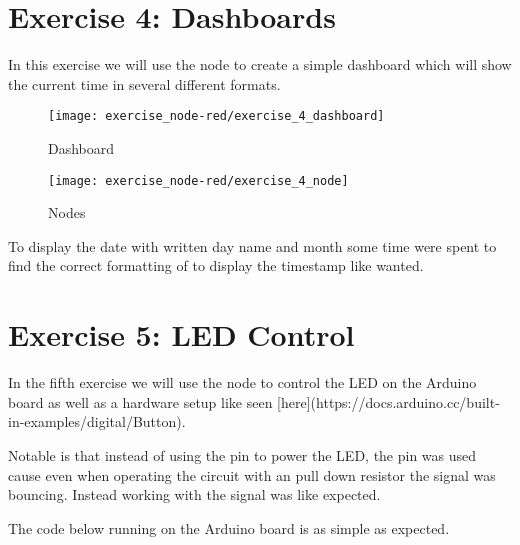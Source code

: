 \section{Exercise 4: Dashboards}

In this exercise we will use the  node to create a simple dashboard which will 
show the current time in several different formats.

\begin{figure}[H]
  \centering
  \texttt{[image: exercise\_node-red/exercise\_4\_dashboard]}
  \caption{Dashboard}
  \label{fig:dashboard}
\end{figure}

\begin{figure}[H]
  \centering
  \texttt{[image: exercise\_node-red/exercise\_4\_node]}
  \caption{Nodes}
  \label{fig:4_nodes}
\end{figure}

To display the date with written day name and month some time were spent to find the correct 
formatting of  to display the timestamp like wanted.


\section{Exercise 5: LED Control}

In the fifth exercise we will use the  node to control the LED on the Arduino board as 
well as a hardware setup like seen [here](https://docs.arduino.cc/built-in-examples/digital/Button).

Notable is that instead of using the  pin to power the LED, the  pin was used 
cause even when operating the circuit with an pull down resistor the  signal was bouncing.
Instead working with the  signal was like expected.

The code below running on the Arduino board is as simple as expected.

